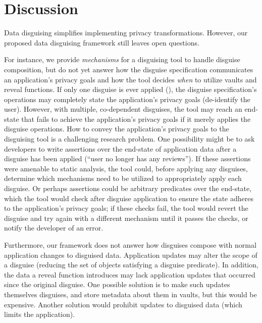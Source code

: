 \section{Discussion}
\label{s:disc}
%
Data disguising simplifies implementing privacy transformations.
%
However, our proposed data disguising framework still leaves open questions.
%

%
For instance, we provide \emph{mechanisms} for a disguising tool
to handle disguise composition, but do not yet answer how the disguise specification
communicates an application's privacy goals and how the tool decides \emph{when} to
utilize vaults and reveal functions.
%
%
If only one disguise is ever applied (\eg \gdpr), the disguise specification's operations
may completely state the application's privacy goals (\eg de-identify the user).
%
However, with multiple, co-dependent disguises, the tool may reach an end-state that
fails to achieve the application's privacy goals if it merely applies the disguise
operations.
%
How to convey the application's privacy goals to the disguising tool is a challenging
research problem.
%
One possibility might be to ask developers to write assertions over the end-state of
application data after a disguise has been applied (\eg ``user no longer has any reviews'').
%
If these assertions were amenable to static analysis, the tool could, before applying any
disguises, determine which mechanisms need to be utilized to appropriately apply each
disguise.
%
Or perhaps assertions could be arbitrary predicates over the end-state, which the
tool would check after disguise application to ensure the state adheres to the
application's privacy goals; if these checks fail, the tool would revert the disguise
and try again with a different mechanism until it passes the checks, or notify the developer
of an error.
%

%
Furthermore, our framework does not answer how disguises compose with normal application
changes to disguised data.
%
Application updates may alter the scope of a disguise (\ie reducing the set of
objects satisfying a disguise predicate).
%
In addition, the data a reveal function introduces may lack application updates that
occurred since the original disguise.
%
One possible solution is to make such updates themselves disguises, and store metadata
about them in vaults, but this would be expensive.
%
Another solution would prohibit updates to disguised data (which limits the application).
%

